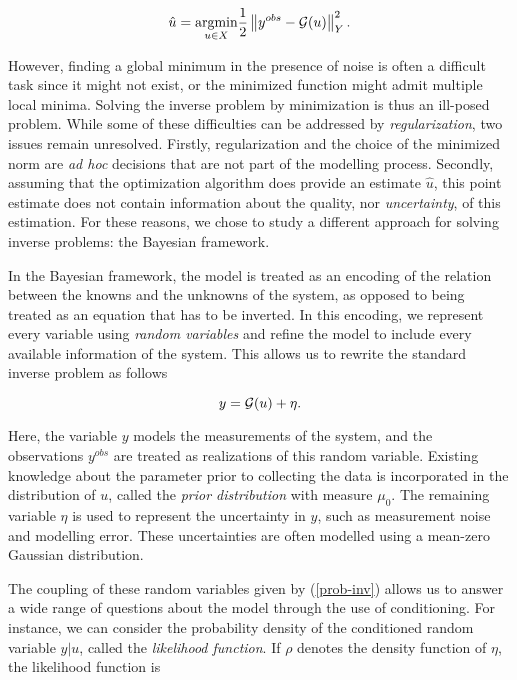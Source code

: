 \begin{equation*}
  \hat u = \underset{u \in X}{\text{argmin}} \frac12\left\lVert y^{obs} - \mathcal{G}(u) \right\rVert_Y^2.
\end{equation*}

However, finding a global minimum in the presence of noise is often a difficult task since it might not exist, or the minimized function might admit multiple local minima. Solving the inverse problem by minimization is thus an ill-posed problem. While some of these difficulties can be addressed by \textit{regularization}, two issues remain unresolved. Firstly, regularization and the choice of the minimized norm are \textit{ad hoc} decisions that are not part of the modelling process. Secondly, assuming that the optimization algorithm does provide an estimate $\hat u$, this point estimate does not contain information about the quality, nor \textit{uncertainty}, of this estimation. For these reasons, we chose to study a different approach for solving inverse problems: the Bayesian framework.

In the Bayesian framework, the model is treated as an encoding of the relation between the knowns and the unknowns of the system, as opposed to being treated as an equation that has to be inverted. In this encoding, we represent every variable using \textit{random variables} and refine the model to include every available information of the system. This allows us to rewrite the standard inverse problem as follows

\begin{equation}\label{prob-inv}
  y = \mathcal{G}(u) + \eta.
\end{equation}

Here, the variable $y$ models the measurements of the system, and the observations $y^{obs}$ are treated as realizations of this random variable. Existing knowledge about the parameter prior to collecting the data is incorporated in the distribution of $u$, called the \textit{prior distribution} with measure $\mu_0$. The remaining variable $\eta$ is used to represent the uncertainty in $y$, such as measurement noise and modelling error. These uncertainties are often modelled using a mean-zero Gaussian distribution.

The coupling of these random variables given by (\ref{prob-inv}) allows us to answer a wide range of questions about the model through the use of conditioning. For instance, we can consider the probability density of the conditioned random variable $y|u$, called the \textit{likelihood function}. If $\rho$ denotes the density function of $\eta$, the likelihood function is

